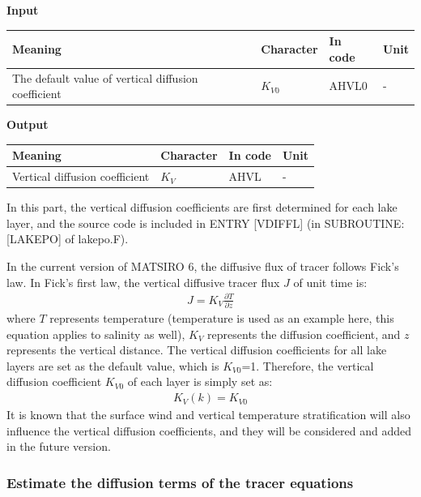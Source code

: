 \textbf{Input}

\begin{longtable}[]{@{}llll@{}}
\toprule
Meaning & Character & In code & Unit \\
\midrule
\endhead
The default value of vertical diffusion coefficient & \(K_{V0}\) & AHVL0 & - \\
\bottomrule
\end{longtable}

\textbf{Output}

\begin{longtable}[]{@{}llll@{}}
\toprule
Meaning & Character & In code & Unit \\
\midrule
\endhead
Vertical diffusion coefficient & \(K_{V}\) & AHVL & - \\
\bottomrule
\end{longtable}

In this part, the vertical diffusion coefficients are first determined for each lake layer, and the source code is included in ENTRY {[}VDIFFL{]} (in SUBROUTINE: {[}LAKEPO{]} of lakepo.F).

In the current version of MATSIRO 6, the diffusive flux of tracer follows Fick's law. In Fick's first law, the vertical diffusive tracer flux \(J\) of unit time is: \begin{eqnarray}
J=K_{V}\frac{\partial T}{\partial z}
\end{eqnarray} where \(T\) represents temperature (temperature is used as an example here, this equation applies to salinity as well), \(K_{V}\) represents the diffusion coefficient, and \(z\) represents the
vertical distance. The vertical diffusion coefficients for all lake layers are set as the default value, which is \(K_{V0}\)=1. Therefore, the vertical diffusion coefficient \(K_{V0}\) of each layer
is simply set as: \begin{eqnarray}
K_{V}(k)=K_{V0}
\end{eqnarray} It is known that the surface wind and vertical temperature stratification will also influence the vertical diffusion coefficients, and they will be considered and added in the future version.

\hypertarget{estimate-the-diffusion-terms-of-the-tracer-equations}{%
\subsubsection{Estimate the diffusion terms of the tracer equations}\label{estimate-the-diffusion-terms-of-the-tracer-equations}}

